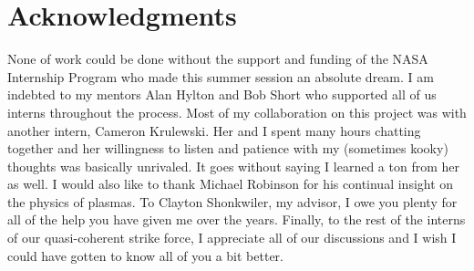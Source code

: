 \documentclass[conf]{new-aiaa}
\begin{document}
\section*{Acknowledgments}

None of work could be done without the support and funding of the NASA Internship Program who made this summer session an absolute dream. I am indebted to my mentors Alan Hylton and Bob Short who supported all of us interns throughout the process. Most of my collaboration on this project was with another intern, Cameron Krulewski. Her and I spent many hours chatting together and her willingness to listen and patience with my (sometimes kooky) thoughts was basically unrivaled. It goes without saying I learned a ton from her as well. I would also like to thank Michael Robinson for his continual insight on the physics of plasmas. To Clayton Shonkwiler, my advisor, I owe you plenty for all of the help you have given me over the years. Finally, to the rest of the interns of our quasi-coherent strike force, I appreciate all of our discussions and I wish I could have gotten to know all of you a bit better.


\end{document}

